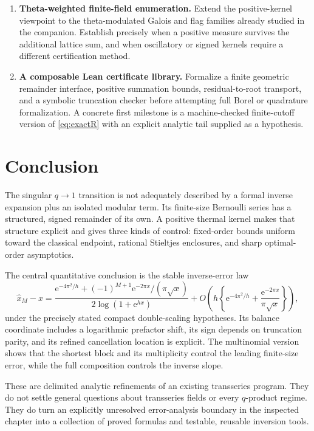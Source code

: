 \documentclass[11pt,a4paper]{article}
\newcommand{\ee}{\mathrm e}
\numberwithin{equation}{section}
\theoremstyle{plain}
\theoremstyle{definition}
\theoremstyle{remark}
\begin{document}
\begin{enumerate}[label=\textbf{Q\arabic*.},leftmargin=13mm]
\item \textbf{Theta-weighted finite-field enumeration.}
Extend the positive-kernel viewpoint to the theta-modulated Galois and flag
families already studied in the companion. Establish precisely when a
positive measure survives the additional lattice sum, and when oscillatory
or signed kernels require a different certification method.

\item \textbf{A composable Lean certificate library.}
Formalize a finite geometric remainder interface, positive summation bounds,
residual-to-root transport, and a symbolic truncation checker before attempting
full Borel or quadrature formalization. A concrete first milestone is a
machine-checked finite-cutoff version of \eqref{eq:exactR} with an explicit
analytic tail supplied as a hypothesis.
\end{enumerate}

\section{Conclusion}

The singular $q\to1$ transition is not adequately described by a formal
inverse expansion plus an isolated modular term. Its finite-size Bernoulli
series has a structured, signed remainder of its own. A positive thermal
kernel makes that structure explicit and gives three kinds of control:
fixed-order bounds uniform toward the classical endpoint, rational
Stieltjes enclosures, and sharp optimal-order asymptotics.

The central quantitative conclusion is the stable inverse-error law
\[
 \widehat x_M-x=
 \frac{\ee^{-4\pi^2/h}+(-1)^{M+1}\ee^{-2\pi x}/(\pi\sqrt{x})}
      {2\log(1+\ee^{hx})}
 +O\!\left(h\left\{\ee^{-4\pi^2/h}
              +\frac{\ee^{-2\pi x}}{\pi\sqrt{x}}\right\}\right),
\]
under the precisely stated compact double-scaling hypotheses. Its balance
coordinate includes a logarithmic prefactor shift, its sign depends on
truncation parity, and its refined cancellation location is explicit.
The multinomial version shows that the shortest block and its multiplicity
control the leading finite-size error, while the full composition controls
the inverse slope.

These are delimited analytic refinements of an existing transseries program.
They do not settle general questions about transseries fields or every
$q$-product regime. They do turn an explicitly unresolved error-analysis
boundary in the inspected chapter into a collection of proved formulas and
testable, reusable inversion tools.
\end{document}
